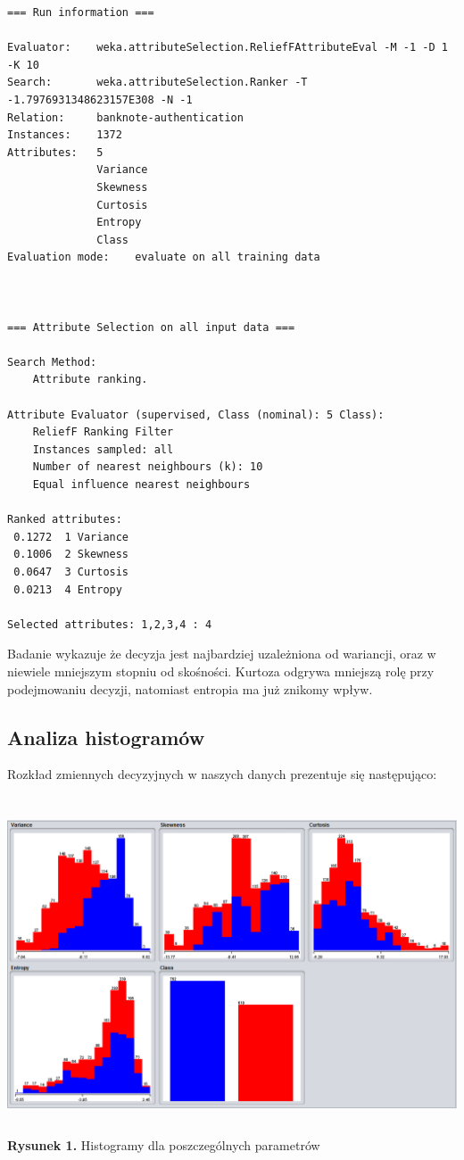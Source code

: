 \documentclass{classrep}
\begin{document}
\scriptsize
\begin{verbatim}
=== Run information ===

Evaluator:    weka.attributeSelection.ReliefFAttributeEval -M -1 -D 1 -K 10
Search:       weka.attributeSelection.Ranker -T -1.7976931348623157E308 -N -1
Relation:     banknote-authentication
Instances:    1372
Attributes:   5
              Variance
              Skewness
              Curtosis
              Entropy
              Class
Evaluation mode:    evaluate on all training data



=== Attribute Selection on all input data ===

Search Method:
	Attribute ranking.

Attribute Evaluator (supervised, Class (nominal): 5 Class):
	ReliefF Ranking Filter
	Instances sampled: all
	Number of nearest neighbours (k): 10
	Equal influence nearest neighbours

Ranked attributes:
 0.1272  1 Variance
 0.1006  2 Skewness
 0.0647  3 Curtosis
 0.0213  4 Entropy

Selected attributes: 1,2,3,4 : 4

\end{verbatim}
\normalsize

Badanie wykazuje że decyzja jest najbardziej uzależniona od wariancji, oraz w niewiele mniejszym stopniu od skośności. Kurtoza odgrywa mniejszą rolę przy podejmowaniu decyzji, natomiast entropia ma już znikomy wpływ.

\subsection{Analiza histogramów}

Rozkład zmiennych decyzyjnych w naszych danych prezentuje się następująco:
\begin{center}
	\includegraphics[height=10cm]{rozklad_parametrow.png}
	\textbf{Rysunek 1.} Histogramy dla poszczególnych parametrów
\end{center}
\end{document}

